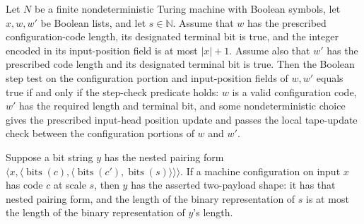 \begin{lemma}
\label{Complexity.Codec.stepAns_iff}
\leanok
{}
Let $N$ be a finite nondeterministic Turing machine with Boolean symbols, let $x,w,w'$
be Boolean lists, and let $s\in\mathbb{N}$. Assume that $w$ has the prescribed
configuration-code length, its designated terminal bit is true, and the integer encoded
in its input-position field is at most $|x|+1$. Assume also that $w'$ has the prescribed
code length and its designated terminal bit is true. Then the Boolean step test on the
configuration portion and input-position fields of $w,w'$ equals true if and only if the
step-check predicate holds: $w$ is a valid configuration code, $w'$ has the required
length and terminal bit, and some nondeterministic choice gives the prescribed
input-head position update and passes the local tape-update check between the
configuration portions of $w$ and $w'$.
\end{lemma}

\begin{lemma}
\label{Complexity.Codec.shape2_of_code}
\leanok
{}
Suppose a bit string $y$ has the nested pairing form $\langle
x,\langle\operatorname{bits}(c),\langle\operatorname{bits}(c'),\operatorname{bits}(s)\rangle\rangle\rangle$.
If a machine configuration on input $x$ has code $c$ at scale $s$, then $y$ has the
asserted two-payload shape: it has that nested pairing form, and the length of the
binary representation of $s$ is at most the length of the binary representation of $y$'s
length.
\end{lemma}

